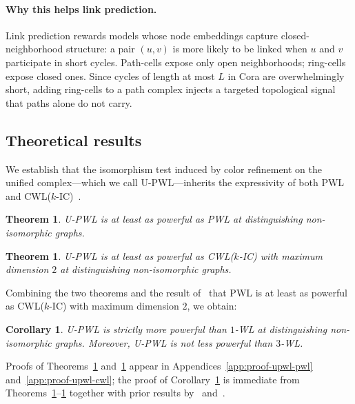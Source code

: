 \documentclass{article}
\newtheorem{corollary}[definition]{Corollary}
\newtheorem{theorem}[definition]{Theorem}
\begin{document}
\paragraph{Why this helps link prediction.}
Link prediction rewards models whose node embeddings capture closed-neighborhood structure: a pair $(u, v)$ is more likely to be linked when $u$ and $v$ participate in short cycles. Path-cells expose only open neighborhoods; ring-cells expose closed ones. Since cycles of length at most $L$ in Cora are overwhelmingly short, adding ring-cells to a path complex injects a targeted topological signal that paths alone do not carry.

\subsection{Theoretical results}
\label{subsec:theory}
We establish that the isomorphism test induced by color refinement on the unified complex---which we call U-PWL---inherits the expressivity of both PWL~\citep{truong_weisfeiler_2024} and CWL($k$-IC)~\citep{bodnar_weisfeiler_2022}.

\begin{theorem}
  \label{thm:upwl-ge-pwl}
  U-PWL is at least as powerful as PWL at distinguishing non-isomorphic graphs.
\end{theorem}
\begin{theorem}
  \label{thm:upwl-ge-cwl}
  U-PWL is at least as powerful as CWL($k$-IC) with maximum dimension $2$ at distinguishing non-isomorphic graphs.
\end{theorem}
Combining the two theorems and the result of~\citet{truong_weisfeiler_2024} that PWL is at least as powerful as CWL($k$-IC) with maximum dimension $2$, we obtain:
\begin{corollary}
  \label{cor:upwl-strict}
  U-PWL is strictly more powerful than $1$-WL at distinguishing non-isomorphic graphs. Moreover, U-PWL is not less powerful than $3$-WL.
\end{corollary}
Proofs of Theorems~\ref{thm:upwl-ge-pwl} and~\ref{thm:upwl-ge-cwl} appear in Appendices~\ref{app:proof-upwl-pwl} and~\ref{app:proof-upwl-cwl}; the proof of Corollary~\ref{cor:upwl-strict} is immediate from Theorems~\ref{thm:upwl-ge-pwl}--\ref{thm:upwl-ge-cwl} together with prior results by~\citet{bodnar_weisfeiler_2021} and~\citet{truong_weisfeiler_2024}.
\end{document}

